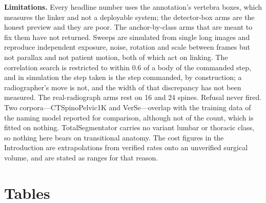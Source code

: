 \documentclass[11pt,letterpaper]{article}
\begin{document}
\noindent\textbf{Limitations.} Every headline number uses the annotation's vertebra boxes, which measures the
linker and not a deployable system; the detector-box arms are the honest preview and they are poor. The
anchor-by-class arms that are meant to fix them have not returned. Sweeps are simulated from single long
images and reproduce independent exposure, noise, rotation and scale between frames but not parallax and not
patient motion, both of which act on linking. The correlation search is restricted to within 0.6 of a body
of the commanded step, and in simulation the step taken is the step commanded, by construction; a
radiographer's move is not, and the width of that discrepancy has not been measured. The real-radiograph arms rest on 16 and 24 spines. Refusal
never fired. Two corpora---CTSpinoPelvic1K and VerSe---overlap with the training data of the naming model
reported for comparison, although not of the count, which is fitted on nothing. TotalSegmentator carries no
variant lumbar or thoracic class, so nothing here bears on transitional anatomy. The cost figures in the
Introduction are extrapolations from verified rates onto an unverified surgical volume, and are stated as
ranges for that reason.

\clearpage
\section*{Tables}
\end{document}

